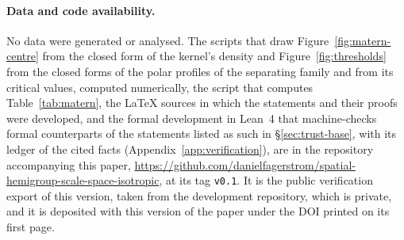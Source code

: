 \paragraph{Data and code availability.} No data were generated or analysed. The scripts that draw
Figure~\ref{fig:matern-centre} from the closed form of the \Matern{} kernel's density and
Figure~\ref{fig:thresholds} from the closed forms of the polar profiles of the separating family
and from its critical values, computed numerically, the script that computes
Table~\ref{tab:matern}, the
LaTeX sources in which the statements and their proofs were developed, and the formal development
in Lean~4 that machine-checks formal counterparts of the statements listed as such in
\S\ref{sec:trust-base}, with its ledger of the cited facts (Appendix~\ref{app:verification}),
are in the repository
accompanying this paper, \url{https://github.com/danielfagerstrom/spatial-hemigroup-scale-space-isotropic},
at its tag \texttt{v0.1}. It is the public verification export of this version, taken from the
development repository, which is private, and it is
deposited with this version of the paper under the DOI printed on its first page.
